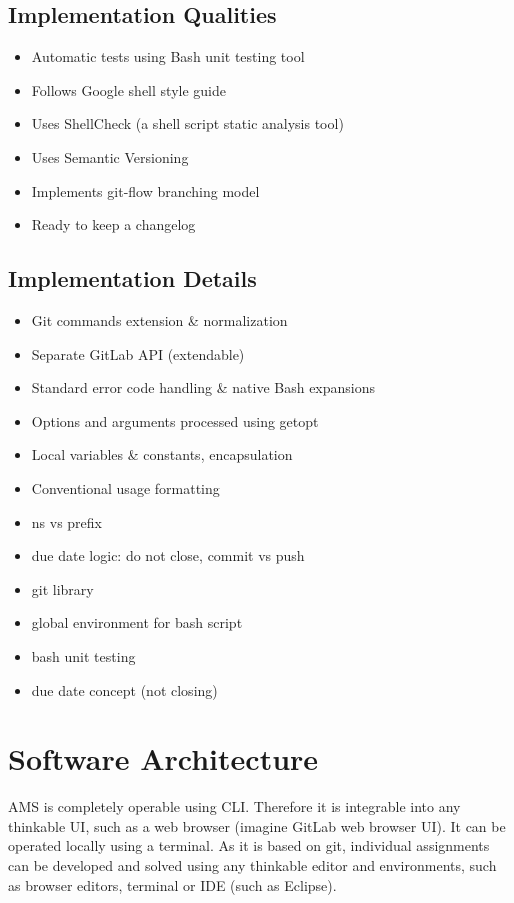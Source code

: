 \subsection{Implementation Qualities}\label{ssec:implqaul}

\begin{itemize}
\item
  {Automatic tests using Bash unit testing tool}
\item
  {Follows Google shell style guide}
\item
  {Uses ShellCheck (a shell script static analysis tool)}
\item
  {Uses Semantic Versioning}
\item
  {Implements git-flow branching model}
\item
  {Ready to keep a changelog}
\end{itemize}

\subsection{Implementation Details}\label{sec:impldet}

\begin{itemize}
\item
  {Git commands extension \& normalization}
\item
  {Separate GitLab API (extendable)}
\item
  {Standard error code handling \& native Bash expansions}
\item
  {Options and arguments processed using getopt}
\item
  {Local variables \& constants, encapsulation}
\item
  {Conventional usage formatting}
\item
  {ns vs prefix}
\item
  {due date logic: do not close, commit vs push}
\item
  {git library}
\item
  {global environment for bash script}
\item
  {bash unit testing}
\item
  {due date concept (not closing)}
\end{itemize}

\section{Software Architecture}\label{sec:softarch}

{AMS is completely operable using CLI. Therefore it is integrable into any thinkable UI, such as a web browser (imagine GitLab web browser UI). It can be operated locally using a terminal. As it is based on git, individual assignments can be developed and solved using any thinkable editor and environments, such as browser editors, terminal or IDE (such as Eclipse).}

